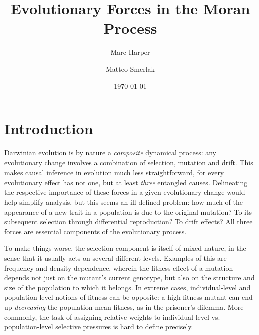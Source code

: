 \documentclass[aps,prd,11pt,notitlepage,nofootinbib,superscriptaddress,showkeys,letterpaper]{revtex4-1}
\begin{document}

\title{\large \bf Evolutionary Forces in the Moran Process}

\author{Marc Harper}
\author{Matteo Smerlak}

\date{\small\today}

\begin{abstract}
\end{abstract}
\maketitle

\section{Introduction}

Darwinian evolution is by nature a \textit{composite} dynamical process: any evolutionary change involves a combination of selection, mutation and drift. This makes causal inference in evolution much less straightforward, for every evolutionary effect has not one, but at least \textit{three} entangled causes. Delineating the respective importance of these forces in a given evolutionary change would help simplify analysis, but this seems an ill-defined problem: how much of the appearance of a new trait in a population is due to the original mutation? To its subsequent selection through differential reproduction? To drift effects? All three forces are essential components of the evolutionary process.

To make things worse, the selection component is itself of mixed nature, in the sense that it usually acts on several different levels. Examples of this are frequency and density dependence, wherein the fitness effect of a mutation depends not just on the mutant's current genotype, but also on the structure and size of the population to which it belongs. In extreme cases, individual-level and population-level notions of fitness can be opposite: a high-fitness mutant can end up \textit{decreasing} the population mean fitness, as in the prisoner's dilemma. More commonly, the task of assigning relative weights to individual-level vs. population-level selective pressures is hard to define precisely.  
\end{document}
